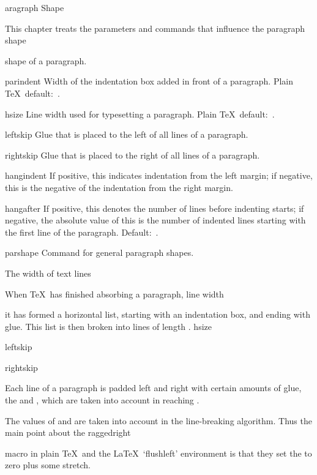 \subject[par:shape] Paragraph Shape

This chapter treats the parameters and commands that influence the
\term paragraph shape\par
shape of a paragraph.

\invent
\item parindent 
      Width of the indentation box added in front of a paragraph.
      Plain \TeX\ default:~\n{20pt}.

\item hsize 
      Line width used for typesetting a paragraph.
      Plain \TeX\ default:~\n{6.5in}.

\item leftskip 
      Glue that is placed to the left of all lines of a paragraph.


\item rightskip 
      Glue that is placed to the right of all lines of a paragraph.


\item hangindent   
      If positive, this indicates indentation from the left margin; 
      if negative, this is the negative of the indentation 
      from the right margin.

\item hangafter   
      If positive, this denotes the number of lines 
      before indenting starts; 
      if negative, the absolute value of this is the number 
      of indented lines starting with the first line of the paragraph.
      Default:~.

\item parshape
      Command for general paragraph shapes.

\inventstop


\point The width of text lines

When \TeX\ has finished absorbing a paragraph, 
\term line width\par
it has formed a horizontal list, starting with an indentation
box, and ending with  glue.
This list is then broken into lines of length .
\csterm hsize\par\csterm leftskip\par\csterm rightskip\par
Each line of a paragraph is padded left and right with
certain amounts of glue, the  and ,
which are taken into account in reaching .

The values of  and  are taken 
into account in the line-breaking algorithm.
Thus the main point about the  
\csterm raggedright\par
macro in plain \TeX\ and the \LaTeX\ `flushleft'
environment is that they
set the  to  zero plus some stretch.

